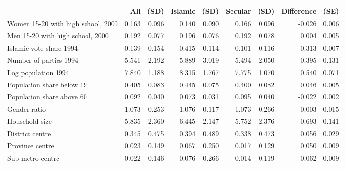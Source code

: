 
\begin{tabular}{lrrrrrrrr}
\toprule
 & All & (SD) & Islamic & (SD) & Secular & (SD) & Difference & (SE)\\
\midrule
Women 15-20 with high school, 2000 & 0.163 & 0.096 & 0.140 & 0.090 & 0.166 & 0.096 & -0.026 & 0.006\\
Men 15-20 with high school, 2000 & 0.192 & 0.077 & 0.196 & 0.076 & 0.192 & 0.078 & 0.004 & 0.005\\
Islamic vote share 1994 & 0.139 & 0.154 & 0.415 & 0.114 & 0.101 & 0.116 & 0.313 & 0.007\\
Number of parties 1994 & 5.541 & 2.192 & 5.889 & 3.019 & 5.494 & 2.050 & 0.395 & 0.131\\
Log population 1994 & 7.840 & 1.188 & 8.315 & 1.767 & 7.775 & 1.070 & 0.540 & 0.071\\
Population share below 19 & 0.405 & 0.083 & 0.445 & 0.075 & 0.400 & 0.082 & 0.046 & 0.005\\
Population share above 60 & 0.092 & 0.040 & 0.073 & 0.031 & 0.095 & 0.040 & -0.022 & 0.002\\
Gender ratio & 1.073 & 0.253 & 1.076 & 0.117 & 1.073 & 0.266 & 0.003 & 0.015\\
Household size & 5.835 & 2.360 & 6.445 & 2.147 & 5.752 & 2.376 & 0.693 & 0.141\\
District centre & 0.345 & 0.475 & 0.394 & 0.489 & 0.338 & 0.473 & 0.056 & 0.029\\
Province centre & 0.023 & 0.149 & 0.067 & 0.250 & 0.017 & 0.129 & 0.050 & 0.009\\
Sub-metro centre & 0.022 & 0.146 & 0.076 & 0.266 & 0.014 & 0.119 & 0.062 & 0.009\\
\bottomrule
\end{tabular}
